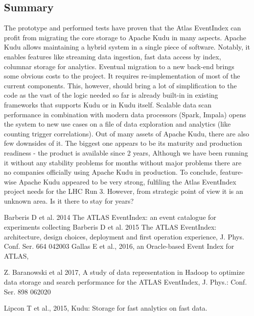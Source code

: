 \documentclass{webofc}
\begin{document}
\begin{linenumbers}
\section{Summary}
\label{sec-7}
The prototype and performed tests have proven that the Atlas EventIndex can profit from migrating the core storage to Apache Kudu in many aspects.
Apache Kudu allows maintaining a hybrid system in a single piece of software. Notably, it enables features like streaming data ingestion, fast data access by index, columnar storage for analytics. 
Eventual migration to a new back-end brings some obvious costs to the project. It requires re-implementation of most of the current components. This, however, should bring a lot of simplification to the code as the vast of the logic needed so far is already built-in in existing frameworks that supports Kudu or in Kudu itself. Scalable data scan performance in combination with modern data processors (Spark, Impala) opens the system to new use cases on a file of data exploration and analytics (like counting trigger correlations).\newline 
\indent
Out of many assets of Apache Kudu, there are also few downsides of it. The biggest one appears to be its maturity and production readiness - the product is available since 2 years, Although we have been running it without any stability problems for months without major problems there are no companies officially using Apache Kudu in production.\newline
\indent
To conclude, feature-wise Apache Kudu appeared to be very strong, fulfiling the Atlas EventIndex project needs for the LHC Run 3. However, from strategic point of view it is an unknown area. Is it there to stay for years? 

\begin{thebibliography}{}

Barberis D et al. 2014 The ATLAS EventIndex: an event catalogue for experiments collecting 
Barberis D et al. 2015 The ATLAS EventIndex: architecture, design choices, deployment and first operation experience, J. Phys. Conf. Ser. 664 042003
Gallas E et al., 2016, an Oracle-based Event Index for ATLAS, 

Z. Baranowski et al 2017, A study of data representation in Hadoop to optimize data storage and search performance for the ATLAS EventIndex, J. Phys.: Conf. Ser. 898 062020

Lipcon T et al., 2015, Kudu: Storage for fast analytics on fast data.



\end{thebibliography}
\end{linenumbers}
\end{document}
